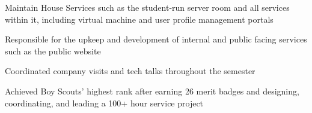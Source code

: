 

\smallskip
\smallskip


\medskip
{}

Maintain House Services such as the student-run server room and all services within it, including virtual machine and user profile management portals

\divider

Responsible for the upkeep and development of internal and public facing services such as the public website

\divider

Coordinated company visits and tech talks throughout the semester

\divider

Achieved Boy Scouts' highest rank after earning 26 merit badges and designing, coordinating, and leading a 100+ hour service project

